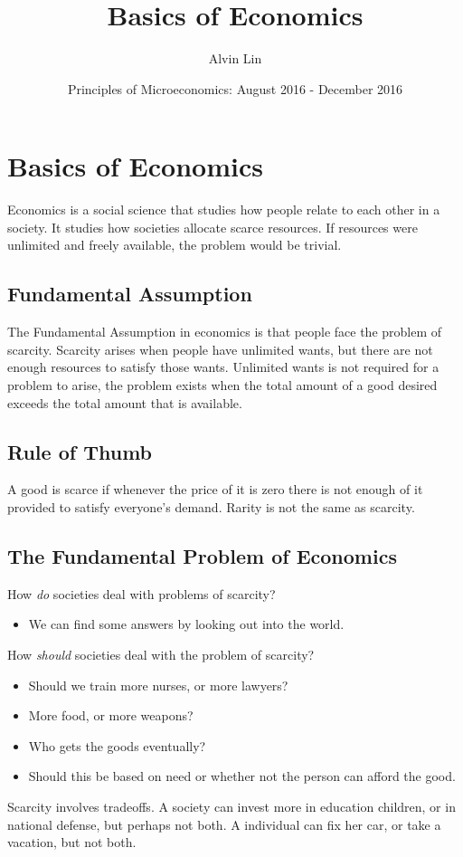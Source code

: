 \documentclass[letterpaper, 12pt]{article}
\title{Basics of Economics}
\author{Alvin Lin}
\date{Principles of Microeconomics: August 2016 - December 2016}
\begin{document}
\maketitle

\section*{Basics of Economics}
Economics is a social science that studies how people relate to each other in
a society. It studies how societies allocate scarce resources. If resources were
unlimited and freely available, the problem would be trivial.

\subsection*{Fundamental Assumption}
The Fundamental Assumption in economics is that people face the problem
of scarcity. Scarcity arises when people have unlimited wants, but there are not
enough resources to satisfy those wants. Unlimited wants is not required for
a problem to arise, the problem exists when the total amount of a good desired
exceeds the total amount that is available.

\subsection*{Rule of Thumb}
A good is scarce if whenever the price of it is zero there is not enough of it
provided to satisfy everyone's demand. Rarity is not the same as scarcity.

\subsection*{The Fundamental Problem of Economics}
How \textit{do} societies deal with problems of scarcity?
\begin{itemize}
  \item We can find some answers by looking out into the world.
\end{itemize}
How \textit{should} societies deal with the problem of scarcity?
\begin{itemize}
  \item Should we train more nurses, or more lawyers?
  \item More food, or more weapons?
  \item Who gets the goods eventually?
  \item Should this be based on need or whether not the person can afford the
        good.
\end{itemize}
Scarcity involves tradeoffs. A society can invest more in education children,
or in national defense, but perhaps not both. A individual can fix her car, or
take a vacation, but not both.
\end{document}
